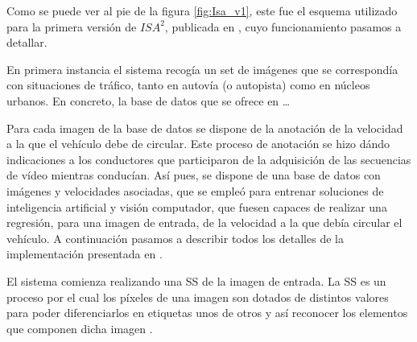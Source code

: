 Como se puede ver al pie de la figura \ref{fig:Isa_v1}, este fue el esquema utilizado para la primera versión de $ISA^{2}$, publicada en \cite{isa2}, cuyo funcionamiento pasamos a detallar.


En primera instancia el sistema recogía un set de imágenes que se correspondía con situaciones de tráfico, tanto en autovía (o autopista) como en núcleos urbanos. En concreto, la base de datos que se ofrece en \cite{isa2} \dots %

Para cada imagen de la base de datos se dispone de la anotación de la velocidad a la que el vehículo debe de circular. Este proceso de anotación se hizo dándo indicaciones a los conductores que participaron de la adquisición de las secuencias de vídeo mientras conducían. Así pues, se dispone de una base de datos con imágenes y velocidades asociadas, que se empleó para entrenar soluciones de inteligencia artificial y visión computador, que fuesen capaces de realizar una regresión, para una imagen de entrada, de la velocidad a la que debía circular el vehículo. A continuación pasamos a describir todos los detalles de la implementación presentada en \cite{isa2}.

El sistema comienza realizando una \ac{SS} de la imagen de entrada. La \ac{SS} es un proceso por el cual los píxeles de una imagen son dotados de distintos valores para poder diferenciarlos en etiquetas unos de otros y así reconocer los elementos que componen dicha imagen \cite{deeplab}. 


